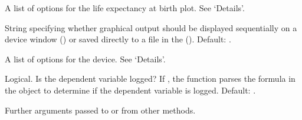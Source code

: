 \begin{Arguments}
\begin{ldescription}
\item[\code{ex0.opts}] A list of options for the life expectancy at birth plot. See `Details'.

\item[\code{print}] String specifying whether graphical output should be
displayed sequentially on a device window () or saved
directly to a  file in the  (). 
Default: .

\item[\code{print.args}] A list of options for the device. See `Details'.

\item[\code{dv.log}] Logical. Is the dependent variable logged? If , the function parses the formula in the  object to determine if the dependent variable is logged. Default: .

\item[\code{...}] Further arguments passed to or from other methods.

\end{ldescription}
\end{Arguments}
%
